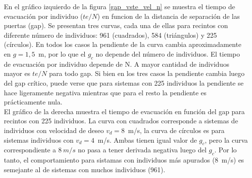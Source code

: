 
En el gráfico izquierdo de la figura \ref{gap_vste_vel_n} se muestra el tiempo de evacuación por individuo ($te/N$) en funcion de la distancia de separación de las puertas (gap). Se presentan tres curvas, cada una de ellas para recintos con diferente número de individuos: 961 (cuadrados), 584 (triángulos) y 225 (círculos). En todos los casos la pendiente de la curva cambia aproximadamente en $g=1,5$~m, por lo que el $g_c$ no depende del número de individuos. 
El tiempo de evacuación por individuo depende de N. A mayor cantidad de individuos mayor es $te/N$ para todo gap. 
Si bien en los tres casos la pendiente cambia luego del gap crítico, puede verse que para sistemas con 225 individuos la pendiente se hace ligeramente negativa mientras que para el resto la pendiente es prácticamente nula. \\
El gráfico de la derecha muestra el tiempo de evacuación en función del gap para recintos con 225 individuos. La curva con cuadrados corresponde a sistemas de individuos con velocidad de deseo $v_d=8$~m/s, la curva de círculos es para sistemas individuos con $v_d=4$~m/s. Ambas tienen igual valor de $g_c$, pero la curva correspondiente a $8~m/s$ no pasa a tener derivada negativa luego del $g_c$. Por lo tanto, el comportamiento para sistamas con individuos más apurados (8~m/s) es semejante al de sistemas con muchos individuos (961). 

